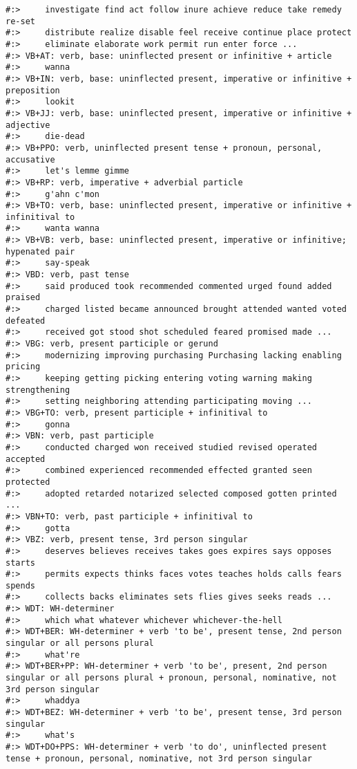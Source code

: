 \documentclass[
]{book}
\begin{document}
\begin{verbatim}
#:>     investigate find act follow inure achieve reduce take remedy re-set
#:>     distribute realize disable feel receive continue place protect
#:>     eliminate elaborate work permit run enter force ...
#:> VB+AT: verb, base: uninflected present or infinitive + article
#:>     wanna
#:> VB+IN: verb, base: uninflected present, imperative or infinitive + preposition
#:>     lookit
#:> VB+JJ: verb, base: uninflected present, imperative or infinitive + adjective
#:>     die-dead
#:> VB+PPO: verb, uninflected present tense + pronoun, personal, accusative
#:>     let's lemme gimme
#:> VB+RP: verb, imperative + adverbial particle
#:>     g'ahn c'mon
#:> VB+TO: verb, base: uninflected present, imperative or infinitive + infinitival to
#:>     wanta wanna
#:> VB+VB: verb, base: uninflected present, imperative or infinitive; hypenated pair
#:>     say-speak
#:> VBD: verb, past tense
#:>     said produced took recommended commented urged found added praised
#:>     charged listed became announced brought attended wanted voted defeated
#:>     received got stood shot scheduled feared promised made ...
#:> VBG: verb, present participle or gerund
#:>     modernizing improving purchasing Purchasing lacking enabling pricing
#:>     keeping getting picking entering voting warning making strengthening
#:>     setting neighboring attending participating moving ...
#:> VBG+TO: verb, present participle + infinitival to
#:>     gonna
#:> VBN: verb, past participle
#:>     conducted charged won received studied revised operated accepted
#:>     combined experienced recommended effected granted seen protected
#:>     adopted retarded notarized selected composed gotten printed ...
#:> VBN+TO: verb, past participle + infinitival to
#:>     gotta
#:> VBZ: verb, present tense, 3rd person singular
#:>     deserves believes receives takes goes expires says opposes starts
#:>     permits expects thinks faces votes teaches holds calls fears spends
#:>     collects backs eliminates sets flies gives seeks reads ...
#:> WDT: WH-determiner
#:>     which what whatever whichever whichever-the-hell
#:> WDT+BER: WH-determiner + verb 'to be', present tense, 2nd person singular or all persons plural
#:>     what're
#:> WDT+BER+PP: WH-determiner + verb 'to be', present, 2nd person singular or all persons plural + pronoun, personal, nominative, not 3rd person singular
#:>     whaddya
#:> WDT+BEZ: WH-determiner + verb 'to be', present tense, 3rd person singular
#:>     what's
#:> WDT+DO+PPS: WH-determiner + verb 'to do', uninflected present tense + pronoun, personal, nominative, not 3rd person singular

\end{verbatim}
\end{document}
